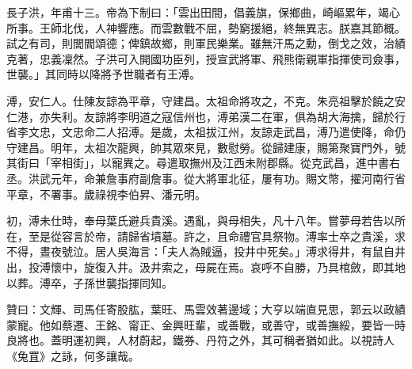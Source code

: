 \begin{pinyinscope}
長子洪，年甫十三。帝為下制曰：「雲出田間，倡義旗，保鄉曲，崎嶇累年，竭心所事。王師北伐，人神響應。而雲數戰不屈，勢窮援絕，終無異志。朕嘉其節概。試之有司，則閭閻頌德；俾鎮故鄉，則軍民樂業。雖無汗馬之勳，倒戈之效，治績克著，忠義凜然。子洪可入開國功臣列，授宣武將軍、飛熊衛親軍指揮使司僉事，世襲。」其同時以降將予世職者有王溥。

溥，安仁人。仕陳友諒為平章，守建昌。太祖命將攻之，不克。朱亮祖擊於饒之安仁港，亦失利。友諒將李明道之寇信州也，溥弟漢二在軍，俱為胡大海擒，歸於行省李文忠，文忠命二人招溥。是歲，太祖拔江州，友諒走武昌，溥乃遣使降，命仍守建昌。明年，太祖次龍興，帥其眾來見，數慰勞。從歸建康，賜第聚寶門外，號其街曰「宰相街」，以寵異之。尋遣取撫州及江西未附郡縣。從克武昌，進中書右丞。洪武元年，命兼詹事府副詹事。從大將軍北征，屢有功。賜文幣，擢河南行省平章，不署事。歲祿視李伯昇、潘元明。

初，溥未仕時，奉母葉氏避兵貴溪。遇亂，與母相失，凡十八年。嘗夢母若告以所在，至是從容言於帝，請歸省墳墓。許之，且命禮官具祭物。溥率士卒之貴溪，求不得，晝夜號泣。居人吳海言：「夫人為賊逼，投井中死矣。」溥求得井，有鼠自井出，投溥懷中，旋復入井。汲井索之，母屍在焉。哀呼不自勝，乃具棺斂，即其地以葬。溥卒，子孫世襲指揮同知。

贊曰：文輝、司馬任寄股肱，葉旺、馬雲效著邊域；大亨以端直見思，郭云以政績蒙寵。他如蔡遷、王銘、甯正、金興旺輩，或善戰，或善守，或善撫綏，要皆一時良將也。蓋明運初興，人材蔚起，鐵券、丹符之外，其可稱者猶如此。以視詩人《兔罝》之詠，何多讓哉。


\end{pinyinscope}